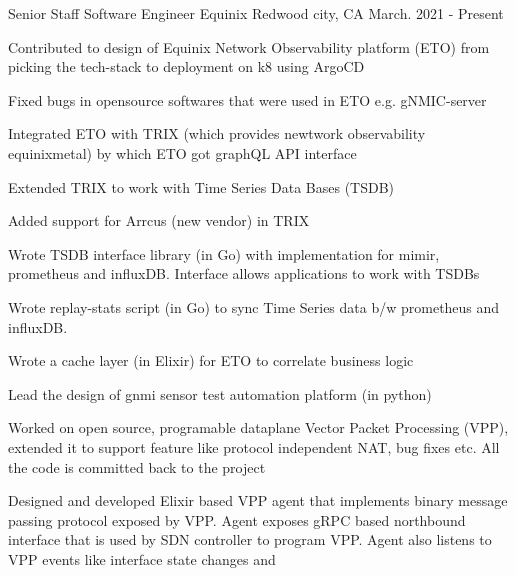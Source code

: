 

\begin{cventries}

  \cventry
    {Senior Staff Software Engineer} %
    {Equinix} %
    {Redwood city, CA} %
    {March. 2021 - Present} %
    {
      \begin{cvitems} %
        \item {Contributed to design of Equinix Network Observability platform (ETO) from picking the tech-stack to deployment on k8 using ArgoCD}
        \item {Fixed bugs in opensource softwares that were used in ETO e.g. gNMIC-server}
        \item {Integrated ETO with TRIX (which provides newtwork observability equinixmetal) by which ETO got graphQL API interface}
        \item {Extended TRIX to work with Time Series Data Bases (TSDB)}
        \item {Added support for Arrcus (new vendor) in TRIX}
        \item {Wrote TSDB interface library (in Go) with implementation for mimir, prometheus and influxDB. Interface allows applications to work with TSDBs}
        \item {Wrote replay-stats script (in Go) to sync Time Series data b/w prometheus and influxDB.}
        \item {Wrote a cache layer (in Elixir) for ETO to correlate business logic}
        \item {Lead the design of gnmi sensor test automation platform (in python)}
        \item {Worked on open source, programable dataplane Vector Packet Processing (VPP), extended it to support feature like protocol independent NAT, bug fixes etc.
               All the code is committed back to the project}
        \item {Designed and developed Elixir based VPP agent that implements binary message passing protocol exposed by VPP.
               Agent exposes gRPC based northbound interface that is used by SDN controller to program VPP. Agent also listens to VPP events like interface state changes and
}
\end{cvitems}}
\end{cventries}
